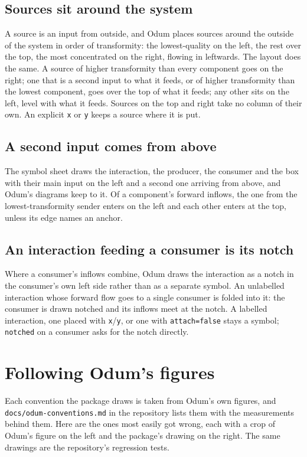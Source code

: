 \documentclass{article}
\begin{document}
\subsection{Sources sit around the system}

A source is an input from outside, and Odum places sources around the outside of
the system in order of transformity: the lowest-quality on the left, the rest
over the top, the most concentrated on the right, flowing in leftwards. The
layout does the same. A source of higher transformity than every component goes
on the right; one that is a second input to what it feeds, or of higher
transformity than the lowest component, goes over the top of what it feeds; any
other sits on the left, level with what it feeds. Sources on the top and right
take no column of their own. An explicit \texttt{x} or \texttt{y} keeps a source
where it is put.

\subsection{A second input comes from above}

The symbol sheet draws the interaction, the producer, the consumer and the box
with their main input on the left and a second one arriving from above, and
Odum's diagrams keep to it. Of a component's forward inflows, the one from the
lowest-transformity sender enters on the left and each other enters at the top,
unless its edge names an anchor.

\subsection{An interaction feeding a consumer is its notch}

Where a consumer's inflows combine, Odum draws the interaction as a notch in the
consumer's own left side rather than as a separate symbol. An unlabelled
interaction whose forward flow goes to a single consumer is folded into it: the
consumer is drawn notched and its inflows meet at the notch. A labelled
interaction, one placed with \texttt{x}/\texttt{y}, or one with
\texttt{attach=false} stays a symbol; \texttt{notched} on a consumer asks for
the notch directly.

\section{Following Odum's figures}
\label{sec:odum}

Each convention the package draws is taken from Odum's own figures, and
\texttt{docs/odum-conventions.md} in the repository lists them with the
measurements behind them. Here are the ones most easily got wrong, each with a
crop of Odum's figure on the left and the package's drawing on the right. The
same drawings are the repository's regression tests.
\end{document}
